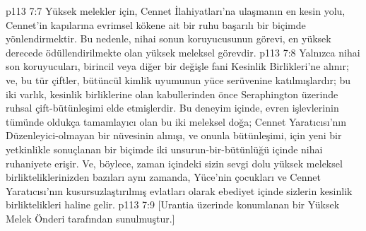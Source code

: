 \vs p113 7:7 Yüksek melekler için, Cennet İlahiyatları’na ulaşmanın en kesin yolu, Cennet’in kapılarına evrimsel kökene ait bir ruhu başarılı bir biçimde yönlendirmektir. Bu nedenle, nihai sonun koruyucusunun görevi, en yüksek derecede ödüllendirilmekte olan yüksek meleksel görevdir.
\vs p113 7:8 Yalnızca nihai son koruyucuları, birincil veya diğer bir değişle fani Kesinlik Birlikleri’ne alınır; ve, bu tür çiftler, bütüncül kimlik uyumunun yüce serüvenine katılmışlardır; bu iki varlık, kesinlik birliklerine olan kabullerinden önce Seraphington üzerinde ruhsal çift\hyp{}bütünleşimi elde etmişlerdir. Bu deneyim içinde, evren işlevlerinin tümünde oldukça tamamlayıcı olan bu iki meleksel doğa; Cennet Yaratıcısı’nın Düzenleyici\hyp{}olmayan bir nüvesinin alınışı, ve onunla bütünleşimi, için yeni bir yetkinlikle sonuçlanan bir biçimde iki unsurun\hyp{}bir\hyp{}bütünlüğü içinde nihai ruhaniyete erişir. Ve, böylece, zaman içindeki sizin sevgi dolu yüksek meleksel birlikteliklerinizden bazıları aynı zamanda, Yüce’nin çocukları ve Cennet Yaratıcısı’nın kusursuzlaştırılmış evlatları olarak ebediyet içinde sizlerin kesinlik birliktelikleri haline gelir.
\vs p113 7:9 [Urantia üzerinde konumlanan bir Yüksek Melek Önderi tarafından sunulmuştur.]
